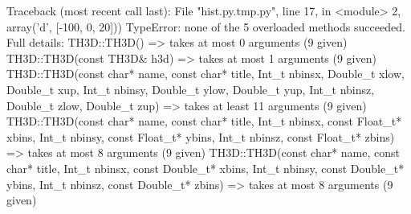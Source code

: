 \begin{footnotesize}
\begin{pyglist}[language=text,texcl=true,abovecaptionskip=0,style=bw]
Traceback (most recent call last):
  File "hist.py.tmp.py", line 17, in <module>
    2, array('d', [-100, 0, 20]))
TypeError: none of the 5 overloaded methods succeeded. Full details:
  TH3D::TH3D() =>
    takes at most 0 arguments (9 given)
  TH3D::TH3D(const TH3D& h3d) =>
    takes at most 1 arguments (9 given)
  TH3D::TH3D(const char* name, const char* title, Int_t nbinsx, Double_t xlow, Double_t xup, Int_t nbinsy, Double_t ylow, Double_t yup, Int_t nbinsz, Double_t zlow, Double_t zup) =>
    takes at least 11 arguments (9 given)
  TH3D::TH3D(const char* name, const char* title, Int_t nbinsx, const Float_t* xbins, Int_t nbinsy, const Float_t* ybins, Int_t nbinsz, const Float_t* zbins) =>
    takes at most 8 arguments (9 given)
  TH3D::TH3D(const char* name, const char* title, Int_t nbinsx, const Double_t* xbins, Int_t nbinsy, const Double_t* ybins, Int_t nbinsz, const Double_t* zbins) =>
    takes at most 8 arguments (9 given)
\end{pyglist}
\end{footnotesize}
